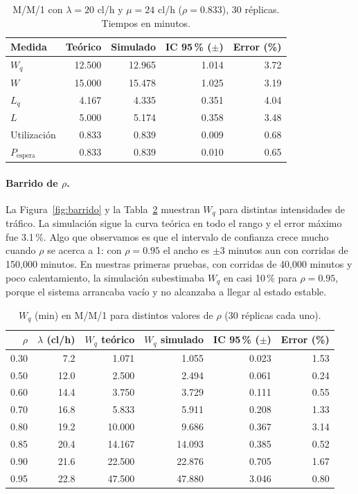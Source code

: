 \documentclass[11pt,letterpaper]{article}
\begin{document}
\begin{table}[H]
\centering
\caption{M/M/1 con $\lambda = 20$ cl/h y $\mu = 24$ cl/h ($\rho = 0.833$), 30 réplicas. Tiempos en minutos.}
\label{tab:mm1}
\small
\begin{tabular}{@{}lrrrr@{}}
\toprule
Medida & Teórico & Simulado & IC 95\,\% ($\pm$) & Error (\%) \\
\midrule
$W_q$ & 12.500 & 12.965 & 1.014 & 3.72 \\
$W$ & 15.000 & 15.478 & 1.025 & 3.19 \\
$L_q$ & 4.167 & 4.335 & 0.351 & 4.04 \\
$L$ & 5.000 & 5.174 & 0.358 & 3.48 \\
Utilización & 0.833 & 0.839 & 0.009 & 0.68 \\
$P_{\text{espera}}$ & 0.833 & 0.839 & 0.010 & 0.65 \\
\bottomrule
\end{tabular}
\end{table}

\paragraph{Barrido de $\rho$.} La Figura~\ref{fig:barrido} y la Tabla~\ref{tab:barrido}
muestran $W_q$ para distintas intensidades de tráfico. La simulación sigue la curva
teórica en todo el rango y el error máximo fue 3.1\,\%. Algo que observamos es que el
intervalo de confianza crece mucho cuando $\rho$ se acerca a 1: con $\rho = 0.95$ el
ancho es $\pm 3$ minutos aun con corridas de 150{,}000 minutos. En nuestras primeras
pruebas, con corridas de 40{,}000 minutos y poco calentamiento, la simulación
subestimaba $W_q$ en casi 10\,\% para $\rho = 0.95$, porque el sistema arrancaba vacío y
no alcanzaba a llegar al estado estable.

\begin{table}[H]
\centering
\caption{$W_q$ (min) en M/M/1 para distintos valores de $\rho$ (30 réplicas cada uno).}
\label{tab:barrido}
\small
\begin{tabular}{@{}rrrrrr@{}}
\toprule
$\rho$ & $\lambda$ (cl/h) & $W_q$ teórico & $W_q$ simulado & IC 95\,\% ($\pm$) & Error (\%) \\
\midrule
0.30 & 7.2 & 1.071 & 1.055 & 0.023 & 1.53 \\
0.50 & 12.0 & 2.500 & 2.494 & 0.061 & 0.24 \\
0.60 & 14.4 & 3.750 & 3.729 & 0.111 & 0.55 \\
0.70 & 16.8 & 5.833 & 5.911 & 0.208 & 1.33 \\
0.80 & 19.2 & 10.000 & 9.686 & 0.367 & 3.14 \\
0.85 & 20.4 & 14.167 & 14.093 & 0.385 & 0.52 \\
0.90 & 21.6 & 22.500 & 22.876 & 0.705 & 1.67 \\
0.95 & 22.8 & 47.500 & 47.880 & 3.046 & 0.80 \\
\bottomrule
\end{tabular}
\end{table}
\end{document}
